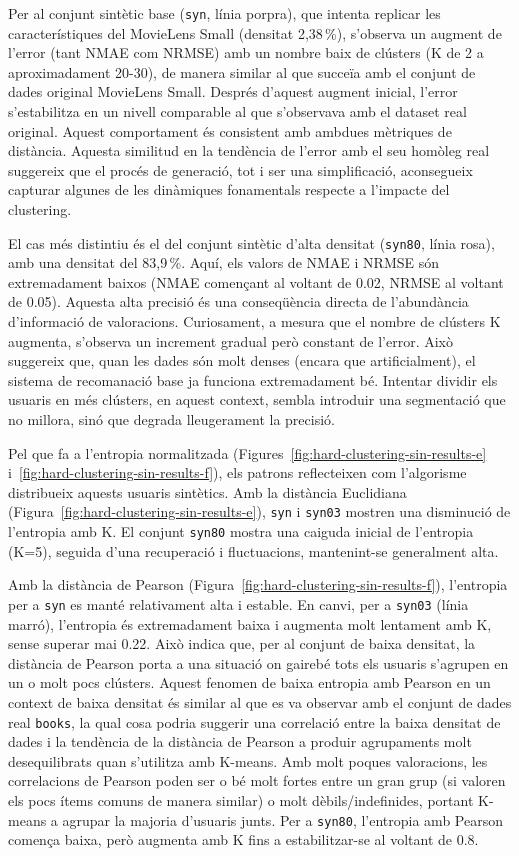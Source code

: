 \documentclass[a4paper,12pt]{report}
\begin{document}
Per al conjunt sintètic base (\texttt{syn}, línia porpra), que intenta replicar les característiques del MovieLens Small (densitat 2,38\,\%), s'observa un augment de l'error (tant NMAE com NRMSE) amb un nombre baix de clústers (K de 2 a aproximadament 20-30), de manera similar al que succeïa amb el conjunt de dades original MovieLens Small. Després d'aquest augment inicial, l'error s'estabilitza en un nivell comparable al que s'observava amb el dataset real original. Aquest comportament és consistent amb ambdues mètriques de distància. Aquesta similitud en la tendència de l'error amb el seu homòleg real suggereix que el procés de generació, tot i ser una simplificació, aconsegueix capturar algunes de les dinàmiques fonamentals respecte a l'impacte del clustering.

El cas més distintiu és el del conjunt sintètic d'alta densitat (\texttt{syn80}, línia rosa), amb una densitat del 83,9\,\%. Aquí, els valors de NMAE i NRMSE són extremadament baixos (NMAE començant al voltant de 0.02, NRMSE al voltant de 0.05). Aquesta alta precisió és una conseqüència directa de l'abundància d'informació de valoracions. Curiosament, a mesura que el nombre de clústers K augmenta, s'observa un increment gradual però constant de l'error. Això suggereix que, quan les dades són molt denses (encara que artificialment), el sistema de recomanació base ja funciona extremadament bé. Intentar dividir els usuaris en més clústers, en aquest context, sembla introduir una segmentació que no millora, sinó que degrada lleugerament la precisió.

Pel que fa a l'entropia normalitzada (Figures~\ref{fig:hard-clustering-sin-results-e} i~\ref{fig:hard-clustering-sin-results-f}), els patrons reflecteixen com l'algorisme distribueix aquests usuaris sintètics. Amb la distància Euclidiana (Figura~\ref{fig:hard-clustering-sin-results-e}), \texttt{syn} i \texttt{syn03} mostren una disminució de l'entropia amb K. El conjunt \texttt{syn80} mostra una caiguda inicial de l'entropia (K=5), seguida d'una recuperació i fluctuacions, mantenint-se generalment alta.

Amb la distància de Pearson (Figura~\ref{fig:hard-clustering-sin-results-f}), l'entropia per a \texttt{syn} es manté relativament alta i estable. En canvi, per a \texttt{syn03} (línia marró), l'entropia és extremadament baixa i augmenta molt lentament amb K, sense superar mai 0.22. Això indica que, per al conjunt de baixa densitat, la distància de Pearson porta a una situació on gairebé tots els usuaris s'agrupen en un o molt pocs clústers. Aquest fenomen de baixa entropia amb Pearson en un context de baixa densitat és similar al que es va observar amb el conjunt de dades real \texttt{books}, la qual cosa podria suggerir una correlació entre la baixa densitat de dades i la tendència de la distància de Pearson a produir agrupaments molt desequilibrats quan s'utilitza amb K-means. Amb molt poques valoracions, les correlacions de Pearson poden ser o bé molt fortes entre un gran grup (si valoren els pocs ítems comuns de manera similar) o molt dèbils/indefinides, portant K-means a agrupar la majoria d'usuaris junts. Per a \texttt{syn80}, l'entropia amb Pearson comença baixa, però augmenta amb K fins a estabilitzar-se al voltant de 0.8.
\end{document}
